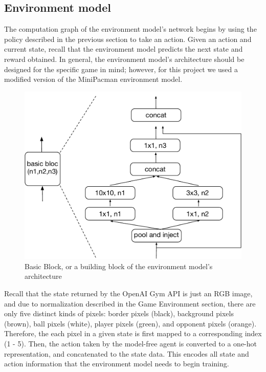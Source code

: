 \documentclass[10pt, twocolumn]{article}
\begin{document}
\subsection{Environment model}

The computation graph of the environment model's network begins by using the policy described in the
previous section to take an action. Given an action and current state, recall that the environment model
predicts the next state and reward obtained. In general, the environment model's architecture should be
designed for the specific game in mind; however, for this project we used a modified version of the
MiniPacman environment model.

\begin{figure}[H]
\centering
\includegraphics[scale=0.3]{basic_layer}
\caption{Basic Block, or a building block of the environment model's architecture}
\label{basic}
\end{figure}

Recall that the state returned by the OpenAI Gym API is just an RGB image, and due to normalization 
described in the Game Environment section, there are only five distinct kinds of pixels: border pixels (black),
background pixels (brown), ball pixels (white), player pixels (green), and opponent pixels (orange).
Therefore, the each pixel in a given state is first mapped to a corresponding index (1 - 5). Then, the action
taken by the model-free agent is converted to a one-hot representation, and concatenated to the
state data. This encodes all state and action information that the environment model needs to begin training.
\end{document}

